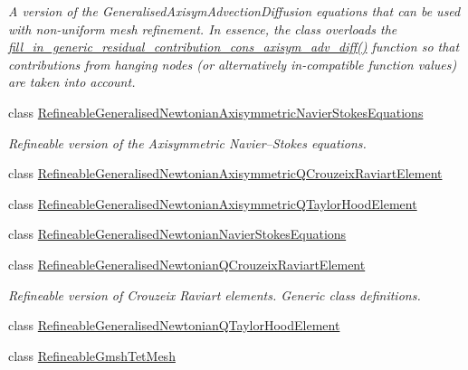 \begin{DoxyCompactItemize}
\begin{DoxyCompactList}\small\item\em A version of the Generalised\+Axisym\+Advection\+Diffusion equations that can be used with non-\/uniform mesh refinement. In essence, the class overloads the \hyperlink{classoomph_1_1RefineableGeneralisedAxisymAdvectionDiffusionEquations_ac8c288d66e8d577940a4a4ee9c6ebab9}{fill\+\_\+in\+\_\+generic\+\_\+residual\+\_\+contribution\+\_\+cons\+\_\+axisym\+\_\+adv\+\_\+diff()} function so that contributions from hanging nodes (or alternatively in-\/compatible function values) are taken into account. \end{DoxyCompactList}\item 
class \hyperlink{classoomph_1_1RefineableGeneralisedNewtonianAxisymmetricNavierStokesEquations}{Refineable\+Generalised\+Newtonian\+Axisymmetric\+Navier\+Stokes\+Equations}
\begin{DoxyCompactList}\small\item\em Refineable version of the Axisymmetric Navier--Stokes equations. \end{DoxyCompactList}\item 
class \hyperlink{classoomph_1_1RefineableGeneralisedNewtonianAxisymmetricQCrouzeixRaviartElement}{Refineable\+Generalised\+Newtonian\+Axisymmetric\+Q\+Crouzeix\+Raviart\+Element}
\item 
class \hyperlink{classoomph_1_1RefineableGeneralisedNewtonianAxisymmetricQTaylorHoodElement}{Refineable\+Generalised\+Newtonian\+Axisymmetric\+Q\+Taylor\+Hood\+Element}
\item 
class \hyperlink{classoomph_1_1RefineableGeneralisedNewtonianNavierStokesEquations}{Refineable\+Generalised\+Newtonian\+Navier\+Stokes\+Equations}
\item 
class \hyperlink{classoomph_1_1RefineableGeneralisedNewtonianQCrouzeixRaviartElement}{Refineable\+Generalised\+Newtonian\+Q\+Crouzeix\+Raviart\+Element}
\begin{DoxyCompactList}\small\item\em Refineable version of Crouzeix Raviart elements. Generic class definitions. \end{DoxyCompactList}\item 
class \hyperlink{classoomph_1_1RefineableGeneralisedNewtonianQTaylorHoodElement}{Refineable\+Generalised\+Newtonian\+Q\+Taylor\+Hood\+Element}
\item 
class \hyperlink{classoomph_1_1RefineableGmshTetMesh}{Refineable\+Gmsh\+Tet\+Mesh}
\item 

\end{DoxyCompactItemize}
